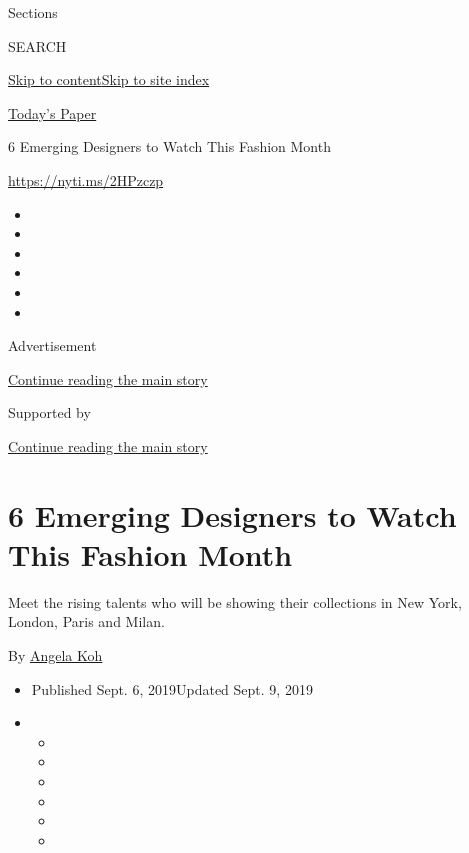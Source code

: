 Sections

SEARCH

\protect\hyperlink{site-content}{Skip to
content}\protect\hyperlink{site-index}{Skip to site index}

\href{https://myaccount.nytimes3xbfgragh.onion/auth/login?response_type=cookie\&client_id=vi}{}

\href{https://www.nytimes3xbfgragh.onion/section/todayspaper}{Today's
Paper}

6 Emerging Designers to Watch This Fashion Month

\url{https://nyti.ms/2HPzczp}

\begin{itemize}
\item
\item
\item
\item
\item
\item
\end{itemize}

Advertisement

\protect\hyperlink{after-top}{Continue reading the main story}

Supported by

\protect\hyperlink{after-sponsor}{Continue reading the main story}

\hypertarget{6-emerging-designers-to-watch-this-fashion-month}{%
\section{6 Emerging Designers to Watch This Fashion
Month}\label{6-emerging-designers-to-watch-this-fashion-month}}

Meet the rising talents who will be showing their collections in New
York, London, Paris and Milan.

By \href{https://www.nytimes3xbfgragh.onion/by/angela-koh}{Angela Koh}

\begin{itemize}
\item
  Published Sept. 6, 2019Updated Sept. 9, 2019
\item
  \begin{itemize}
  \item
  \item
  \item
  \item
  \item
  \item
  \end{itemize}
\end{itemize}

